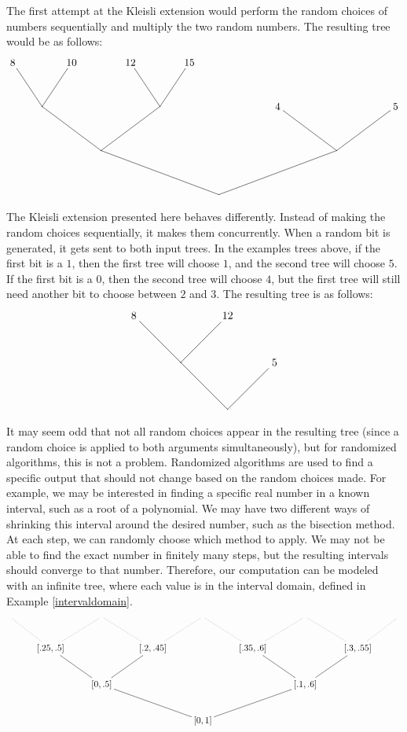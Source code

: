 The first attempt at the Kleisli extension would perform the random choices of numbers sequentially and multiply the two random numbers.  The resulting tree would be as follows: 
\[
\begin{xy}
(0,45)*+{8} = "v1";%
(20,45)*+{10} = "v2";%
(40,45)*+{12} = "v3";%
(60,45)*+{15} = "v4";%
(10,30)*{} = "v9";%
(50,30)*{} = "v10";%
(90,30)*+{4} = "v11";%
(130,30)*+{5} = "v12";%
(30,15)*{} = "v13";%
(110,15)*{} = "v14";%
(70,0)*{} = "v15";%
{\ar@{-} "v9"; "v1"};%
{\ar@{-} "v9"; "v2"};%
{\ar@{-} "v3"; "v10"};%
{\ar@{-} "v10"; "v4"};%
{\ar@{-} "v13"; "v9"};%
{\ar@{-} "v13"; "v10"};%
{\ar@{-} "v14"; "v11"};%
{\ar@{-} "v14"; "v12"};%
{\ar@{-} "v15"; "v13"};%
{\ar@{-} "v15"; "v14"};%
\end{xy}
\]

The Kleisli extension presented here behaves differently.  Instead of making the random choices sequentially, it makes them concurrently.  When a random bit is generated, it gets sent to both input trees.  In the examples trees above, if the first bit is a $1$, then the first tree will choose $1$, and the second tree will choose $5$.  If the first bit is a $0$, then the second tree will choose $4$, but the first tree will still need another bit to choose between $2$ and $3$.  The resulting tree is as follows:
\[
\begin{xy}
(-5,30)*+{8} = "v4";%
(25,30)*+{12} = "v5";%
(10,15)*{} = "v8";%
(40,15)*+{5} = "v9";%
(25,0)*{} = "v10";%
{\ar@{-} "v8"; "v5"};%
{\ar@{-} "v8"; "v4"};%
{\ar@{-} "v10"; "v8"};%
{\ar@{-} "v10"; "v9"};%
\end{xy}
\]

It may seem odd that not all random choices appear in the resulting tree (since a random choice is applied to both arguments simultaneously), but for randomized algorithms, this is not a problem.  Randomized algorithms are used to find a specific output that should not change based on the random choices made.  For example, we may be interested in finding a specific real number in a known interval, such as a root of a polynomial.
We may have two different ways of shrinking this interval around the desired number, such as the bisection method.  At each step, we can randomly choose which method to apply.  We may not be able to find the exact number in finitely many steps, but the resulting intervals should converge to that number.  Therefore, our computation can be modeled with an infinite tree, where each value is in the interval domain, defined in Example \ref{intervaldomain}.
\[
\xymatrix{
& & & & & & & &\\
& [.25,.5]\ar@{.}[ul]\ar@{.}[ur] & & [.2,.45]\ar@{.}[ul]\ar@{.}[ur] & & [.35,.6]\ar@{.}[ul]\ar@{.}[ur] & & [.3,.55]\ar@{.}[ul]\ar@{.}[ur]\\
& & [0,.5]\ar@{-}[ul]\ar@{-}[ur] & & & & [.1,.6]\ar@{-}[ul]\ar@{-}[ur] \\
& & & & [0,1]\ar@{-}[ull]\ar@{-}[urr]
}
\]  

